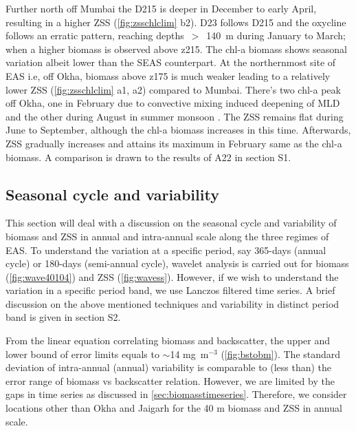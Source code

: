 \documentclass[authoryear,review,12pt]{elsarticle}
\begin{document}
	Further north off Mumbai the D215 is deeper in December to early April, resulting in a higher ZSS (\cref{fig:zsschlclim} b2). D23 follows D215 and the oxycline follows an erratic pattern, reaching depths~$>$~140~m during January to March; when a higher biomass is observed above z215. The chl-a biomass shows seasonal variation albeit lower than the SEAS counterpart. At the northernmost site of EAS i.e, off Okha, biomass above z175 is much weaker leading to a relatively lower ZSS (\cref{fig:zsschlclim} a1, a2) compared to Mumbai.  There's two chl-a peak off Okha, one in February due to convective mixing induced deepening of MLD \citep{wiggert2005monsoon,levy2007basin,shankar2016inhibition,keerthi2017physical} and the other during August in summer monsoon \citep{wiggert2005monsoon,levy2007basin}. The ZSS remains flat during June to September, although the chl-a biomass increases in this time.  Afterwards, ZSS gradually increases and attains its maximum in February same as the chl-a biomass. A comparison is drawn to the results of A22 in section S1.
	\subsection{Seasonal cycle and variability}
	\label{sec:seasonalcyclezss}
	This section will deal with a discussion on the seasonal cycle and variability of biomass and ZSS in annual and intra-annual scale along the three regimes of EAS. To understand the variation at a specific period, say 365-days (annual cycle) or 180-days (semi-annual cycle), wavelet analysis is carried out for biomass (\cref{fig:wave40104}) and ZSS (\cref{fig:wavess}). However, if we wish to understand the variation in a specific period band, we use Lanczos filtered time series. A brief discussion on the above mentioned techniques and variability in distinct period band is given in section S2. 
	
	From the linear equation correlating biomass and backscatter, the upper and lower bound of error limits equals to $\sim$14 mg~m$^{-3}$ (\cref{fig:bstobm}). The standard deviation of intra-annual (annual) variability is comparable to (less than) the error range of biomass vs backscatter relation. However, we are limited by the gaps in time series as discussed in \cref{sec:biomasstimeseries}. Therefore, we consider locations other than Okha and Jaigarh for the 40 m biomass and ZSS in annual scale. 
	
\end{document}

